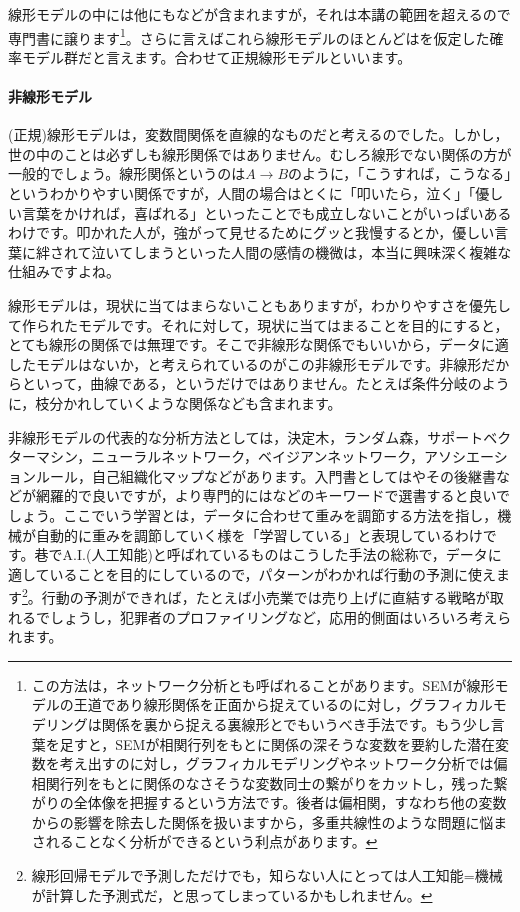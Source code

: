\documentclass{ltjsbook}
\begin{document}
線形モデルの中には他にも\parencite{Miyagawa1997}などが含まれますが，それは本講の範囲を超えるので専門書に譲ります\footnote{この方法は，ネットワーク分析とも呼ばれることがあります\parencite{NetworkPsychometrics}。SEMが線形モデルの王道であり線形関係を正面から捉えているのに対し，グラフィカルモデリングは関係を裏から捉える裏線形とでもいうべき手法です。もう少し言葉を足すと，SEMが相関行列をもとに関係の深そうな変数を要約した潜在変数を考え出すのに対し，グラフィカルモデリングやネットワーク分析では偏相関行列をもとに関係のなさそうな変数同士の繋がりをカットし，残った繋がりの全体像を把握するという方法です。後者は偏相関，すなわち他の変数からの影響を除去した関係を扱いますから，多重共線性のような問題に悩まされることなく分析ができるという利点があります。}。さらに言えばこれら線形モデルのほとんどはを仮定した確率モデル群だと言えます。合わせて正規線形モデルといいます。


\paragraph{非線形モデル}
(正規)線形モデルは，変数間関係を直線的なものだと考えるのでした。しかし，世の中のことは必ずしも線形関係ではありません。むしろ線形でない関係の方が一般的でしょう。線形関係というのは$A \to B$のように，「こうすれば，こうなる」というわかりやすい関係ですが，人間の場合はとくに「叩いたら，泣く」「優しい言葉をかければ，喜ばれる」といったことでも成立しないことがいっぱいあるわけです。叩かれた人が，強がって見せるためにグッと我慢するとか，優しい言葉に絆されて泣いてしまうといった人間の感情の機微は，本当に興味深く複雑な仕組みですよね。

線形モデルは，現状に当てはまらないこともありますが，わかりやすさを優先して作られたモデルです。それに対して，現状に当てはまることを目的にすると，とても線形の関係では無理です。そこで非線形な関係でもいいから，データに適したモデルはないか，と考えられているのがこの非線形モデルです。非線形だからといって，曲線である，というだけではありません。たとえば条件分岐のように，枝分かれしていくような関係なども含まれます。

非線形モデルの代表的な分析方法としては，決定木，ランダム森，サポートベクターマシン，ニューラルネットワーク，ベイジアンネットワーク，アソシエーションルール，自己組織化マップなどがあります。入門書としては\textcite{Toyoda2008}やその後継書\textcite{Toyoda2023}などが網羅的で良いですが，より専門的にはなどのキーワードで選書すると良いでしょう。ここでいう学習とは，データに合わせて重みを調節する方法を指し，機械が自動的に重みを調節していく様を「学習している」と表現しているわけです。巷でA.I.(人工知能)と呼ばれているものはこうした手法の総称で，データに適していることを目的にしているので，パターンがわかれば行動の予測に使えます\footnote{線形回帰モデルで予測しただけでも，知らない人にとっては人工知能=機械が計算した予測式だ，と思ってしまっているかもしれません。}。行動の予測ができれば，たとえば小売業では売り上げに直結する戦略が取れるでしょうし，犯罪者のプロファイリングなど，応用的側面はいろいろ考えられます。
\end{document}
